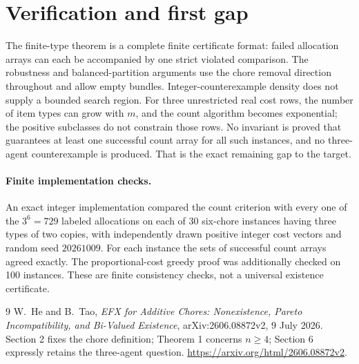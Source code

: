 \documentclass[11pt]{article}
\theoremstyle{definition}
\begin{document}
\section{Verification and first gap}
The finite-type theorem is a complete finite certificate format: failed
allocation arrays can each be accompanied by one strict violated comparison.
The robustness and balanced-partition arguments use the chore removal direction
throughout and allow empty bundles. Integer-counterexample density does not
supply a bounded search region. For three unrestricted real cost rows, the
number of item types can grow with $m$, and the count algorithm becomes
exponential; the positive subclasses do not constrain those rows. No invariant
is proved that guarantees at least one successful count array for all such
instances, and no three-agent counterexample is produced. That is the exact
remaining gap to the target.

\paragraph{Finite implementation checks.}
An exact integer implementation compared the count criterion with every
one of the $3^6=729$ labeled allocations on each of 30 six-chore instances
having three types of two copies, with independently drawn positive integer
cost vectors and random seed $20261009$. For each instance the sets of
successful count arrays agreed exactly. The proportional-cost greedy proof
was additionally checked on 100 instances. These are finite consistency
checks, not a universal existence certificate.

\begin{thebibliography}{9}
 W.~He and B.~Tao, \emph{EFX for Additive Chores: Nonexistence,
Pareto Incompatibility, and Bi-Valued Existence}, arXiv:2606.08872v2,
9 July 2026. Section 2 fixes the chore definition; Theorem 1 concerns
$n\geq4$; Section 6 expressly retains the three-agent question.
\url{https://arxiv.org/html/2606.08872v2}.
\end{thebibliography}
\end{document}
